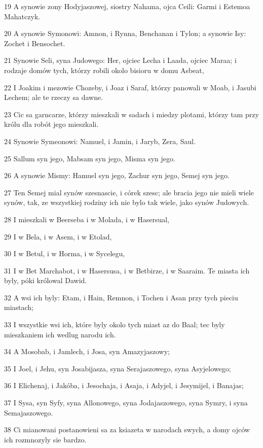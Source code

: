 \par 19 A synowie zony Hodyjaszowej, siostry Nahama, ojca Ceili: Garmi i Estemoa Mahatczyk.
\par 20 A synowie Symonowi: Amnon, i Rynna, Benchanan i Tylon; a synowie Isy: Zochet i Bensochet.
\par 21 Synowie Seli, syna Judowego: Her, ojciec Lecha i Laada, ojciec Maraa; i rodzaje domów tych, którzy robili okolo bisioru w domu Asbeat,
\par 22 I Joakim i mezowie Chozeby, i Joaz i Saraf, którzy panowali w Moab, i Jasubi Lechem; ale te rzeczy sa dawne.
\par 23 Cic sa garncarze, którzy mieszkali w sadach i miedzy plotami, którzy tam przy królu dla robót jego mieszkali.
\par 24 Synowie Symeonowi: Namuel, i Jamin, i Jaryb, Zera, Saul.
\par 25 Sallum syn jego, Mabsam syn jego, Misma syn jego.
\par 26 A synowie Mismy: Hamuel syn jego, Zachur syn jego, Semej syn jego.
\par 27 Ten Semej mial synów szesnascie, i córek szesc; ale bracia jego nie mieli wiele synów, tak, ze wszystkiej rodziny ich nie bylo tak wiele, jako synów Judowych.
\par 28 I mieszkali w Beerseba i w Molada, i w Hasersual,
\par 29 I w Bela, i w Asem, i w Etolad,
\par 30 I w Betul, i w Horma, i w Sycelegu,
\par 31 I w Bet Marchabot, i w Hasersusa, i w Betbirze, i w Saaraim. Te miasta ich byly, póki królowal Dawid.
\par 32 A wsi ich byly: Etam, i Hain, Remnon, i Tochen i Asan przy tych pieciu miastach;
\par 33 I wszystkie wsi ich, które byly okolo tych miast az do Baal; tec byly mieszkaniem ich wedlug narodu ich.
\par 34 A Mosobab, i Jamlech, i Josa, syn Amazyjaszowy;
\par 35 I Joel, i Jehu, syn Josabijasza, syna Serajaszowego, syna Asyjelowego;
\par 36 I Elichenaj, i Jakóba, i Jesochaja, i Asaja, i Adyjel, i Jesymijel, i Banajas;
\par 37 I Sysa, syn Syfy, syna Allonowego, syna Jodajaszowego, syna Symry, i syna Semajaszowego.
\par 38 Ci mianowani postanowieni sa za ksiazeta w narodach swych, a domy ojców ich rozmnozyly sie bardzo.
